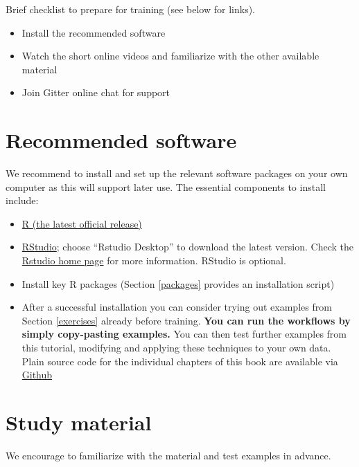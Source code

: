 \documentclass[
]{book}
\providecommand{\tightlist}{%
  \setlength{\itemsep}{0pt}\setlength{\parskip}{0pt}}
\begin{document}
Brief checklist to prepare for training (see below for links).

\begin{itemize}
\tightlist
\item
  Install the recommended software
\item
  Watch the short online videos and familiarize with the other available material
\item
  Join Gitter online chat for support
\end{itemize}

\hypertarget{software}{%
\section{Recommended software}\label{software}}

We recommend to install and set up the relevant software packages on
your own computer as this will support later use. The essential
components to install include:

\begin{itemize}
\item
  \href{https://www.r-project.org/}{R (the latest official release)}
\item
  \href{https://www.rstudio.com/products/rstudio/download/}{RStudio};
  choose ``Rstudio Desktop'' to download the latest version. Check the
  \href{https://www.rstudio.com/}{Rstudio home page} for more
  information. RStudio is optional.
\item
  Install key R packages (Section \ref{packages} provides an installation script)
\item
  After a successful installation you can consider trying out examples
  from Section \ref{exercises} already before training. \textbf{You can run
  the workflows by simply copy-pasting examples.} You can then test
  further examples from this tutorial, modifying and applying these
  techniques to your own data. Plain source code for the individual chapters of this book are available via \href{https://github.com/microbiome/OMA/tree/master/R}{Github}
\end{itemize}

\hypertarget{material}{%
\section{Study material}\label{material}}

We encourage to familiarize with the material and test examples in advance.
\end{document}
